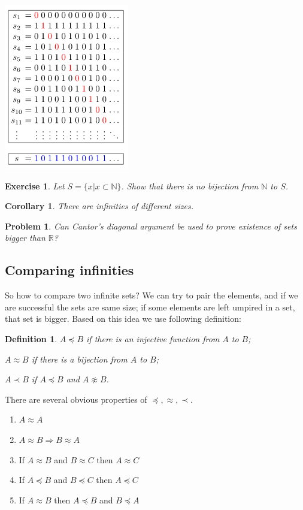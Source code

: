 \documentclass[11pt,a5paper]{article}
\newtheorem{definition}{Definition}
\newtheorem{exercise}{Exercise}
\newtheorem{problem}{Problem}
\newtheorem*{corollary}{Corollary}
\begin{document}
\includegraphics[scale=0.8]{cda}

\begin{exercise}
Let $S=\{x|x\subset \mathbb{N}\}$. Show that there is no bijection from $\mathbb{N}$ to $S$.
\end{exercise}

\begin{corollary} 
There are infinities of different sizes.
\end{corollary}

\begin{problem} 
Can Cantor's diagonal argument be used to prove existence of sets bigger than $\mathbb{R}$?
\end{problem}

\subsection*{Comparing infinities}

\noindent So how to compare two infinite sets? We can try to pair the elements, and if we are successful the sets are same size; if some elements are left umpired in a set, that set is bigger. Based on this idea we use following definition:

\begin{definition}
$A\preceq B$ if there is an injective function from $A$ to $B$;

$A\approx B$ if there is a bijection from $A$ to $B$; 

$A\prec B$ if $A\preceq B$ and $A\not\approx B$.
\end{definition}


\noindent There are several obvious properties of $\preceq, \approx, \prec$.
\begin{enumerate}
  \item $A\approx A$
  \item $A\approx B \Rightarrow B\approx A$
  \item If $A\approx B$ and $B\approx C$ then $A\approx C$
  \item If $A\preceq B$ and $B\preceq C$ then $A\preceq C$
  \item If $A\approx B$ then $A\preceq B$ and $B\preceq A$
\end{enumerate}
\end{document}
